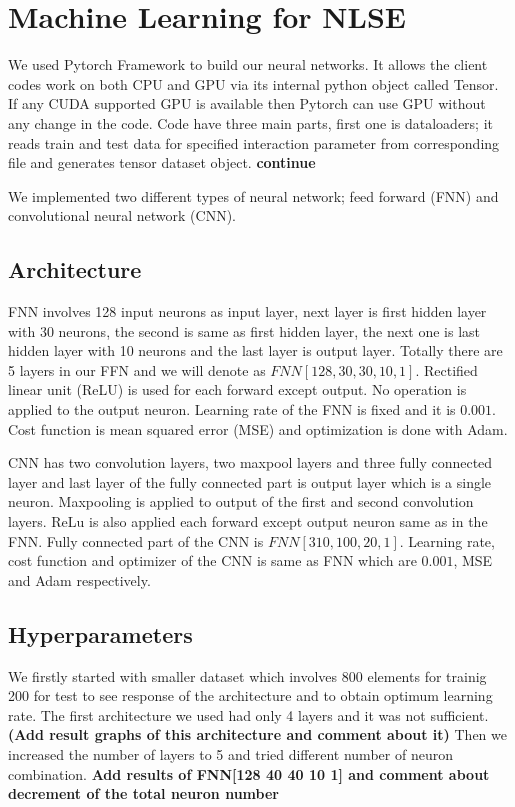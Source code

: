 \documentclass[a4paper,times,12pt]{article}
\begin{document}
\section{Machine Learning for NLSE}

We used Pytorch Framework to build our neural networks. It allows the client codes work on both CPU and GPU via its internal python object called Tensor. If any CUDA supported GPU is available then Pytorch can use GPU without any change in the code. Code have three main parts, first one is dataloaders; it reads train and test data for specified interaction parameter from corresponding file and generates tensor dataset object. \textbf{continue}


We implemented two different types of neural network; feed forward (FNN) and convolutional neural network (CNN).


\subsection{Architecture}

FNN involves 128 input neurons as input layer, next layer is first hidden layer with 30 neurons, the second is same as first hidden layer, the next one is last hidden layer with 10 neurons and the last layer is output layer. Totally there are 5 layers in our FFN and we will denote as $FNN[128, 30, 30, 10, 1]$. Rectified linear unit (ReLU) is used for each forward except output. No operation is applied to the output neuron. Learning rate of the FNN is fixed and it is $0.001$. Cost function is mean squared error (MSE) and optimization is done with Adam. 


CNN has two convolution layers, two maxpool layers and three fully connected layer and last layer of the fully connected part is output layer which is a single neuron. Maxpooling is applied to output of the first and second convolution layers. ReLu is also applied each forward except output neuron same as in the FNN. Fully connected part of the CNN is $FNN[310, 100, 20, 1]$. Learning rate, cost function and optimizer of the CNN is same as FNN which are $0.001$, MSE and Adam respectively.


\subsection{Hyperparameters}

We firstly started with smaller dataset which involves 800 elements for trainig 200 for test to see response of the architecture and to obtain optimum learning rate. The first architecture we used had only 4 layers and it was not sufficient. \textbf{(Add result graphs of this architecture and comment about it)} Then we increased the number of layers to 5 and tried different number of neuron combination. \textbf{Add results of FNN[128 40 40 10 1] and comment about decrement of the total neuron number}




\newpage
\end{document}
